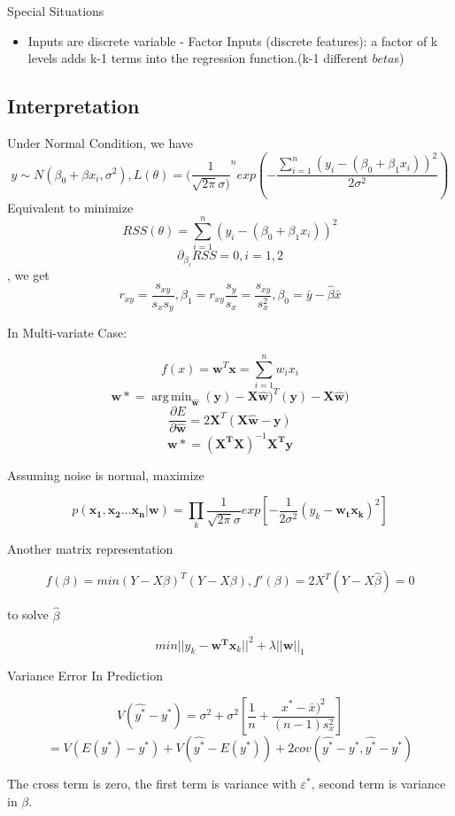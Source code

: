 \documentclass[11pt, openany]{book}              %
\DeclareMathOperator*{\argmin}{arg\,min}  %
\begin{document}
Special Situations

\begin{itemize}
    \item Inputs are discrete variable - Factor Inputs (discrete features): a factor of k levels adds k-1 terms into the regression function.(k-1 different $beta$s)
\end{itemize}


\subsection{Interpretation}


Under Normal Condition, we have
$$y \sim N(\beta_0 + \beta x_i, \sigma^2), L(\theta) = (\frac{1}{\sqrt{2\pi} \sigma)}^n exp( - \frac{\sum_{i=1}^n (y_i - (\beta_0 +\beta_1x_i))^2}{2\sigma^2})$$ 
Equivalent to minimize
$$RSS(\theta) = \sum_{i=1}^n (y_i - (\beta_0 +\beta_1x_i))^2$$
$$ \partial_{\beta_i} RSS = 0, i =1,2$$, we get
$$ r_{xy} = \frac{s_{xy}}{s_xs_y}, \beta_1 = r_{xy}\frac{s_y}{s_x} =\frac{s_{xy}}{s_x^2},\beta_0 = \bar{y}-\hat{\beta}\bar{x} $$

In Multi-variate Case:

$$ f(x) = \mathbf{w}^T \mathbf{x} = \sum_{i=1}^n w_i x_i $$
$$\mathbf{w*} = \argmin_{\mathbf{\hat{w}}}(\mathbf{y})-\mathbf{X \hat{w}} )^T(\mathbf{y})-\mathbf{X \hat{w}} )$$
$$\frac{\partial{E}}{\partial{\mathbf{\hat{w}}}} = 2 \mathbf{X}^T(\mathbf{X \hat{w}} - \mathbf{y})$$
$$ \mathbf{w*} = (\mathbf{X^T X})^{-1} \mathbf{X^T y} $$

Assuming noise is normal, maximize 

$$p(\mathbf{x_1, x_2 ... x_n}| \mathbf{ w} ) = \prod_k \frac{1}{\sqrt{2\pi} \sigma} exp[ -\frac{1}{2\sigma^2} (y_k - \mathbf{w_t x_k} )^2 ]$$ 

Another matrix representation

$$f(\beta) = min (Y-X\beta)^T(Y-X\beta), f'(\beta) = 2X^T(Y-X\hat{\beta}) = 0$$ 

to solve $\hat{\beta}$

$$ min ||y_k - \mathbf{w^T x}_k ||^2 + \lambda ||\mathbf{w}||_1 $$




Variance Error In Prediction

$$V(\hat{y^*} - y^*) = \sigma^2 + \sigma^2[\frac{1}{n} + \frac{x^*-\bar{x})^2}{(n-1)s_x^2}]$$
$$ = V(E(y^*) - y^*) + V(\hat{y^*} - E(y^*)) + 2 cov(\hat{y^*} - y^*, \hat{y^*} - y^*)$$

The cross term is zero, the first term is variance with $\varepsilon^*$, second term is variance in $\beta$. 
\end{document}
